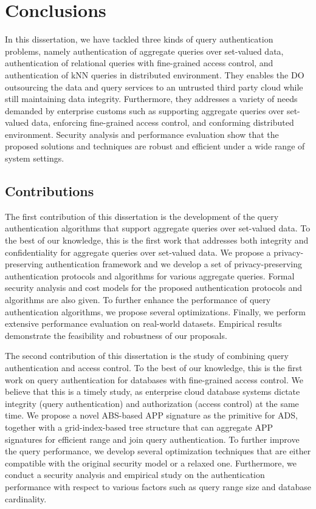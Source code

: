 \chapter{Conclusions}\label{chap:conclusions}

In this dissertation, we have tackled three kinds of query authentication problems, namely authentication of aggregate queries over set-valued data, authentication of relational queries with fine-grained access control, and authentication of {kNN} queries in distributed environment. They enables the DO outsourcing the data and query services to an untrusted third party cloud while still maintaining data integrity. Furthermore, they addresses a variety of needs demanded by enterprise customs such as supporting aggregate queries over set-valued data, enforcing fine-grained access control, and conforming distributed environment. Security analysis and performance evaluation show that the proposed solutions and techniques are robust and efficient under a wide range of system settings.

\section{Contributions}

The first contribution of this dissertation is the development of the query authentication algorithms that support aggregate queries over set-valued data. To the best of our knowledge, this is the first work that addresses both integrity and confidentiality for aggregate queries over set-valued data. We propose a privacy-preserving authentication framework and we develop a set of privacy-preserving authentication protocols and algorithms for various aggregate queries. Formal security analysis and cost models for the proposed authentication protocols and algorithms are also given. To further enhance the performance of query authentication algorithms, we propose several optimizations. Finally, we perform extensive performance evaluation on real-world datasets. Empirical results demonstrate the feasibility and robustness of our proposals.

The second contribution of this dissertation is the study of combining query authentication and access control. To the best of our knowledge, this is the first work on query authentication for databases with fine-grained access control. We believe that this is a timely study, as enterprise cloud database systems dictate integrity (query authentication) and authorization (access control) at the same time. We propose a novel ABS-based APP signature as the primitive for ADS, together with a grid-index-based tree structure that can aggregate APP signatures for efficient range and join query authentication. To further improve the query performance, we develop several optimization techniques that are either compatible with the original security model or a relaxed one. Furthermore, we conduct a security analysis and empirical study on the authentication performance with respect to various factors such as query range size and database cardinality.

